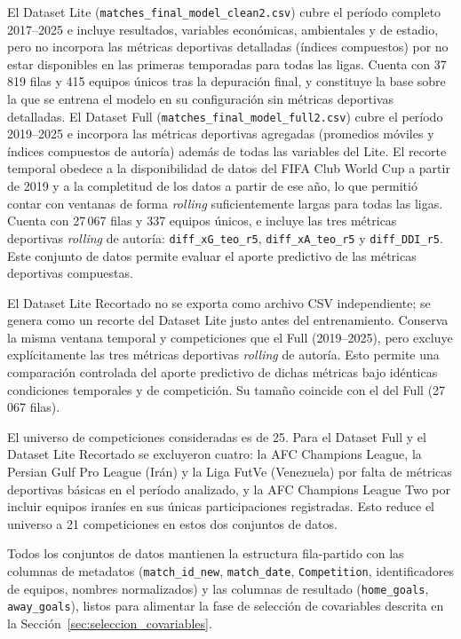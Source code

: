 El Dataset Lite (\texttt{matches\_final\_model\_clean2.csv}) 
cubre el per\'iodo completo 2017--2025 e incluye resultados, variables econ\'omicas, ambientales y de estadio, pero no incorpora las m\'etricas deportivas detalladas (\'indices compuestos) por no estar disponibles en las primeras temporadas para todas las ligas. Cuenta con 37\,819 filas y 415 equipos \'unicos tras la depuraci\'on final, y constituye la base sobre la que se entrena el modelo en su configuraci\'on sin m\'etricas deportivas detalladas. El Dataset Full (\texttt{matches\_final\_model\_full2.csv}) cubre el per\'iodo 2019--2025 e incorpora las m\'etricas deportivas agregadas (promedios m\'oviles y \'indices compuestos de autor\'ia) adem\'as de todas las variables del Lite. El recorte temporal obedece a la disponibilidad de datos del FIFA Club World Cup a partir de 2019 y a la completitud de los datos a partir de ese a\~no, lo que permiti\'o contar con ventanas de forma \textit{rolling} suficientemente largas para todas las ligas. Cuenta con 27\,067 filas y 337 equipos \'unicos, e incluye las tres m\'etricas deportivas \textit{rolling} de autor\'ia: \texttt{diff\_xG\_teo\_r5}, \texttt{diff\_xA\_teo\_r5} y \texttt{diff\_DDI\_r5}. Este conjunto de datos permite evaluar el aporte predictivo de las m\'etricas deportivas compuestas.

El Dataset Lite Recortado no se exporta como archivo CSV independiente; se genera como un recorte del Dataset Lite justo antes del entrenamiento. Conserva la misma ventana temporal y competiciones que el Full (2019--2025), pero excluye expl\'icitamente las tres m\'etricas deportivas \textit{rolling} de autor\'ia. Esto permite una comparaci\'on controlada del aporte predictivo de dichas m\'etricas bajo id\'enticas condiciones temporales y de competici\'on. Su tama\~no coincide con el del Full (27\,067 filas).

El universo de competiciones consideradas es de 25. Para el Dataset Full y el Dataset Lite Recortado se excluyeron cuatro: la AFC Champions League, la Persian Gulf Pro League (Ir\'an) y la Liga FutVe (Venezuela) por falta de m\'etricas deportivas b\'asicas en el per\'iodo analizado, y la AFC Champions League Two por incluir equipos iran\'ies en sus \'unicas participaciones registradas. Esto reduce el universo a 21 competiciones en estos dos conjuntos de datos.

Todos los conjuntos de datos mantienen la estructura fila-partido con las columnas de metadatos (\texttt{match\_id\_new}, \texttt{match\_date}, \texttt{Competition}, identificadores de equipos, nombres normalizados) y las columnas de resultado (\texttt{home\_goals}, \texttt{away\_goals}), listos para alimentar la fase de selecci\'on de covariables descrita en la Secci\'on~\ref{sec:seleccion_covariables}.

